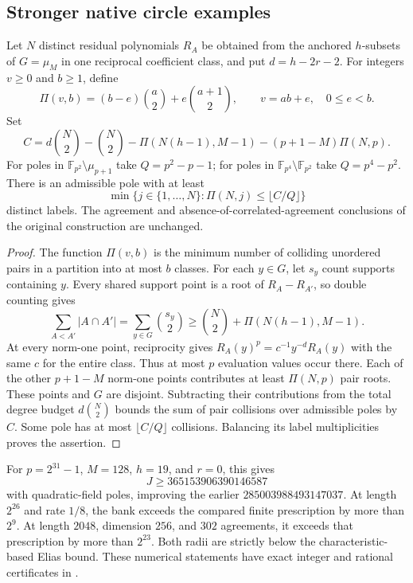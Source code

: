 \subsection{Stronger native circle examples}
\label{sec:overnight-circle}
\begin{proposition}
Let $N$ distinct residual polynomials $R_A$ be obtained from the
anchored $h$-subsets of $G=\mu_M$ in one reciprocal coefficient class,
and put $d=h-2r-2$. For integers $v\ge0$ and $b\ge1$, define
\[
 \Pi(v,b)=(b-e)\binom a2+e\binom{a+1}2,
 \qquad v=ab+e,\quad 0\le e<b.
\]
Set
\[
 C=d\binom N2-\binom N2-\Pi(N(h-1),M-1)
       -(p+1-M)\Pi(N,p).
\]
For poles in $\mathbb F_{p^2}\setminus\mu_{p+1}$ take
$Q=p^2-p-1$; for poles in
$\mathbb F_{p^4}\setminus\mathbb F_{p^2}$ take $Q=p^4-p^2$.
There is an admissible pole with at least
\[
 \min\{j\in\{1,\ldots,N\}:\Pi(N,j)\le\lfloor C/Q\rfloor\}
\]
distinct labels. The agreement and absence-of-correlated-agreement
conclusions of the original construction are unchanged.
\end{proposition}
\begin{proof}
The function $\Pi(v,b)$ is the minimum number of colliding unordered
pairs in a partition into at most $b$ classes. For each $y\in G$, let
$s_y$ count supports containing $y$. Every shared support point is
a root of $R_A-R_{A'}$, so double counting gives
\[
 \sum_{A<A'}|A\cap A'|
 =\sum_{y\in G}\binom{s_y}2
 \ge\binom N2+\Pi(N(h-1),M-1).
\]
At every norm-one point, reciprocity gives
$R_A(y)^p=c^{-1}y^{-d}R_A(y)$ with the same $c$ for the entire class.
Thus at most $p$ evaluation values occur there. Each of the other
$p+1-M$ norm-one points contributes at least $\Pi(N,p)$ pair roots.
These points and $G$ are disjoint. Subtracting their contributions
from the total degree budget $d\binom N2$ bounds the sum of pair
collisions over admissible poles by $C$. Some pole has at most
$\lfloor C/Q\rfloor$ collisions. Balancing its label multiplicities
proves the assertion.
\end{proof}

For $p=2^{31}-1$, $M=128$, $h=19$, and $r=0$, this gives
\[
 J\ge365153906390146587
\]
with quadratic-field poles, improving the earlier
$285003988493147037$. At length $2^{26}$ and rate $1/8$, the bank
exceeds the compared finite prescription by more than $2^9$.
At length $2048$, dimension $256$, and $302$ agreements, it exceeds
that prescription by more than $2^{23}$. Both radii are strictly
below the characteristic-based Elias bound. These numerical
statements have exact integer and rational certificates in
.

